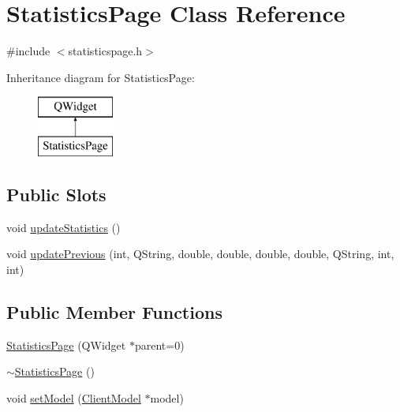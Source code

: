 \hypertarget{class_statistics_page}{}\section{Statistics\+Page Class Reference}
\label{class_statistics_page}


{\ttfamily \#include $<$statisticspage.\+h$>$}

Inheritance diagram for Statistics\+Page\+:\begin{figure}[H]
\begin{center}
\leavevmode
\includegraphics[height=2.000000cm]{class_statistics_page}
\end{center}
\end{figure}
\subsection*{Public Slots}
\begin{DoxyCompactItemize}
\item 
void \hyperlink{class_statistics_page_ae2defb5914f76600d9247b4d9c27258a}{update\+Statistics} ()
\item 
void \hyperlink{class_statistics_page_acdf111845b66dded9b0357aca90c845e}{update\+Previous} (int, Q\+String, double, double, double, double, Q\+String, int, int)
\end{DoxyCompactItemize}
\subsection*{Public Member Functions}
\begin{DoxyCompactItemize}
\item 
\hyperlink{class_statistics_page_ac0758358c37867a61ca65021db144b67}{Statistics\+Page} (Q\+Widget $\ast$parent=0)
\item 
\hyperlink{class_statistics_page_a0b725cc8e07f091f12688b02c00bc96a}{$\sim$\+Statistics\+Page} ()
\item 
void \hyperlink{class_statistics_page_a77a574b060d83075980926b74b2e5638}{set\+Model} (\hyperlink{class_client_model}{Client\+Model} $\ast$model)
\end{DoxyCompactItemize}
